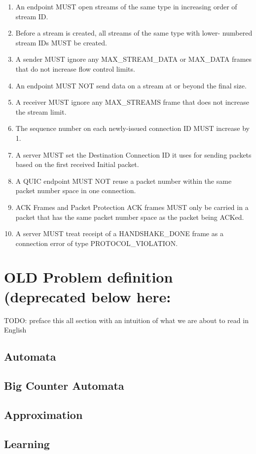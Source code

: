 \documentclass{article}
\begin{document}
\begin{enumerate}
    \item An endpoint MUST open streams of the same type in increasing order of stream ID.
    \item Before a stream is created, all streams of the same type with lower- numbered stream IDs MUST be created.
    \item A sender MUST ignore any MAX\_STREAM\_DATA or MAX\_DATA frames that do not increase flow control limits.
    \item An endpoint MUST NOT send data on a stream at or beyond the final size.
    \item A receiver MUST ignore any MAX\_STREAMS frame that does not increase the stream limit.
    \item The sequence number on each newly-issued connection ID MUST increase by 1.
    \item A server MUST set the Destination Connection ID it uses for sending packets based on the first received Initial packet.
    \item A QUIC endpoint MUST NOT reuse a packet number within the same packet number space in one connection.
    \item ACK Frames and Packet Protection ACK frames MUST only be carried in a packet that has the same packet number space as the packet being ACKed.
    \item A server MUST treat receipt of a HANDSHAKE\_DONE frame as a connection error of type PROTOCOL\_VIOLATION.
\end{enumerate}


\pagebreak
\section{OLD Problem definition (deprecated below here:}

TODO: preface this all section with an intuition of what we are about to read in English

\subsection{Automata}

\subsection{Big Counter Automata}

\subsection{Approximation}

%
%
\subsection{Learning}

\end{document}
